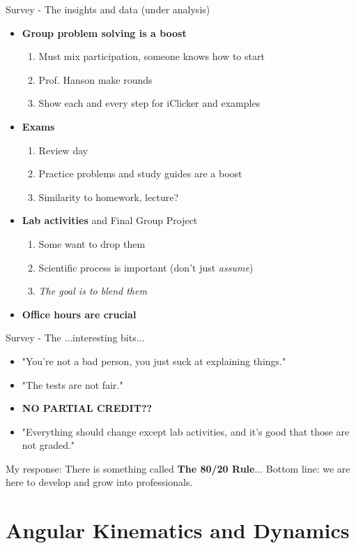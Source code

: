 \documentclass{beamer}
\begin{document}
\begin{frame}{Survey - The insights and data (under analysis)}
\small
\begin{itemize}
\item \textbf{Group problem solving is a boost}
\begin{enumerate}
\item Must mix participation, someone knows how to start
\item Prof. Hanson make rounds
\item Show each and every step for iClicker and examples
\end{enumerate}
\item \textbf{Exams}
\begin{enumerate}
\item Review day
\item Practice problems and study guides are a boost
\item \alert{Similarity to homework, lecture?}
\end{enumerate}
\item \textbf{Lab activities} and \alert{Final Group Project}
\begin{enumerate}
\item Some want to drop them
\item Scientific process is important (don't just \textit{assume})
\item \textit{The goal is to blend them}
\end{enumerate}
\item \textbf{Office hours are crucial}
\end{itemize}
\end{frame}

\begin{frame}{Survey - The ...interesting bits...}
\small
\begin{itemize}
\item "You're not a bad person, you just suck at explaining things."
\item "The tests are not fair."
\item \textbf{NO PARTIAL CREDIT??}
\item "Everything should change except lab activities, and it's good that those are not graded."
\end{itemize}
My response: There is something called \textbf{The 80/20 Rule}...  Bottom line: we are here to develop and grow into professionals.
\end{frame}

\section{Angular Kinematics and Dynamics}
\end{document}
